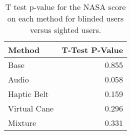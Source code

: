 
\begin{table}[!htb]
\centering
\caption{T test p-value for the NASA score on each method for blinded users versus sighted users.}
\label{tab:ttest_nasa_score}
\begin{tabular}{lr}
\toprule
      Method &  T-Test P-Value \\
\midrule
        Base &           0.855 \\
       Audio &           0.058 \\
 Haptic Belt &           0.159 \\
Virtual Cane &           0.296 \\
     Mixture &           0.331 \\
\bottomrule
\end{tabular}
\end{table}

